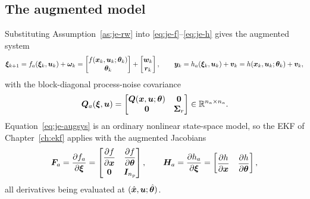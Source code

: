 \subsection{The augmented model}
Substituting Assumption~\ref{as:je-rw} into \eqref{eq:je-f}--\eqref{eq:je-h} gives the augmented
system
\begin{equation}
\bm{\xi}_{k+1}=f_a(\bm{\xi}_k,\bm{u}_k)+\bm{\omega}_k
=\begin{bmatrix}f(\bm{x}_k,\bm{u}_k;\bm{\theta}_k)\\ \bm{\theta}_k\end{bmatrix}+\begin{bmatrix}\bm{w}_k\\ \bm{r}_k\end{bmatrix},
\qquad
\bm{y}_k=h_a(\bm{\xi}_k,\bm{u}_k)+\bm{v}_k=h(\bm{x}_k,\bm{u}_k;\bm{\theta}_k)+\bm{v}_k ,
\label{eq:je-augsys}
\end{equation}
with the block-diagonal process-noise covariance
\begin{equation}
\bm{Q}_a(\bm{\xi},\bm{u})=\begin{bmatrix}\bm{Q}(\bm{x},\bm{u};\bm{\theta}) & \bm{0}\\ \bm{0} & \bm{\Sigma}_r\end{bmatrix}\in\mathbb{R}^{n_a\times n_a}.
\label{eq:je-Qa}
\end{equation}
Equation~\eqref{eq:je-augsys} is an ordinary nonlinear state-space model, so the EKF of
Chapter~\ref{ch:ekf} applies with the augmented Jacobians
\begin{equation}
\bm{F}_a=\frac{\partial f_a}{\partial \bm{\xi}}
=\begin{bmatrix}\dfrac{\partial f}{\partial \bm{x}} & \dfrac{\partial f}{\partial \bm{\theta}}\\[2mm]
                \bm{0} & \bm{I}_{n_p}\end{bmatrix},
\qquad
\bm{H}_a=\frac{\partial h_a}{\partial \bm{\xi}}
=\begin{bmatrix}\dfrac{\partial h}{\partial \bm{x}} & \dfrac{\partial h}{\partial \bm{\theta}}\end{bmatrix},
\label{eq:je-jac}
\end{equation}
all derivatives being evaluated at $(\hat{\bm{x}},\bm{u};\hat{\bm{\theta}})$.

